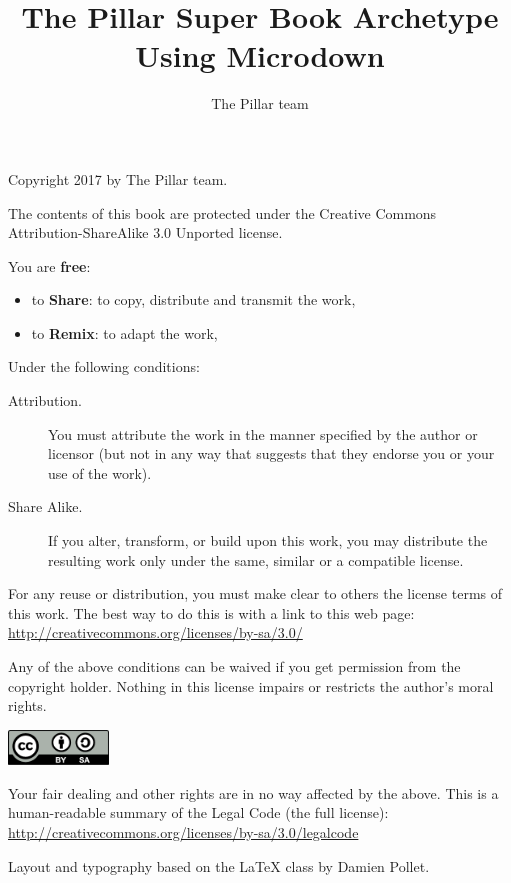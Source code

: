 \documentclass[10pt,twoside,english]{_support/latex/sbabook/sbabook}
\title{The Pillar Super Book Archetype Using Microdown}
\author{The Pillar team}
\begin{document}
\maketitle
\pagestyle{titlingpage}
\thispagestyle{titlingpage} %

\cleartoverso
{\small

  Copyright 2017 by The Pillar team.

  The contents of this book are protected under the Creative Commons
  Attribution-ShareAlike 3.0 Unported license.

  You are \textbf{free}:
  \begin{itemize}
  \item to \textbf{Share}: to copy, distribute and transmit the work,
  \item to \textbf{Remix}: to adapt the work,
  \end{itemize}

  Under the following conditions:
  \begin{description}
  \item[Attribution.] You must attribute the work in the manner specified by the
    author or licensor (but not in any way that suggests that they endorse you
    or your use of the work).
  \item[Share Alike.] If you alter, transform, or build upon this work, you may
    distribute the resulting work only under the same, similar or a compatible
    license.
  \end{description}

  For any reuse or distribution, you must make clear to others the
  license terms of this work. The best way to do this is with a link to
  this web page: \\
  \url{http://creativecommons.org/licenses/by-sa/3.0/}

  Any of the above conditions can be waived if you get permission from
  the copyright holder. Nothing in this license impairs or restricts the
  author's moral rights.

  \begin{center}
    \includegraphics[width=0.2\textwidth]{_support/latex/sbabook/CreativeCommons-BY-SA.pdf}
  \end{center}

  Your fair dealing and other rights are in no way affected by the
  above. This is a human-readable summary of the Legal Code (the full
  license): \\
  \url{http://creativecommons.org/licenses/by-sa/3.0/legalcode}

  \vfill

  Layout and typography based on the  \LaTeX{} class by Damien
  Pollet.
}
\end{document}
